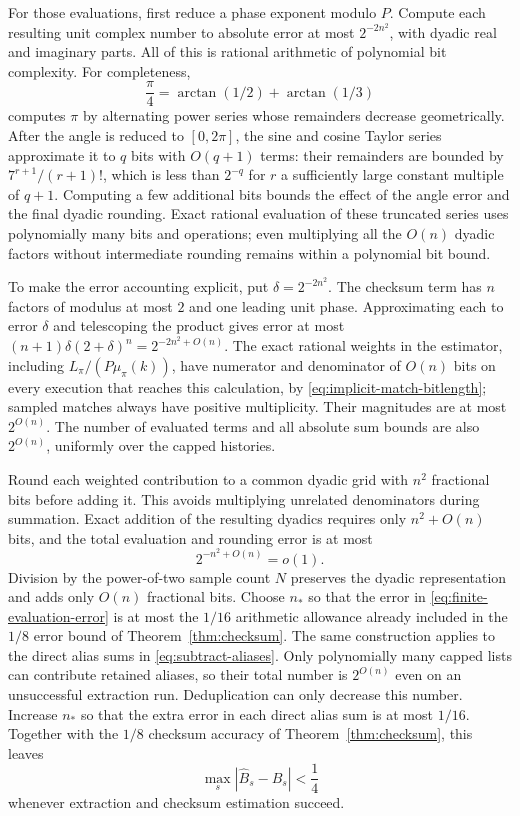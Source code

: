 For those evaluations, first reduce a phase exponent modulo $P$.  Compute
each resulting unit complex number to absolute error at most
$2^{-2n^2}$, with dyadic real and imaginary parts.  All of this is rational
arithmetic of polynomial bit complexity.  For completeness,
\[
 \frac\pi4=\arctan(1/2)+\arctan(1/3)
\]
computes $\pi$ by alternating power series whose remainders decrease
geometrically.  After the angle is reduced to $[0,2\pi]$, the sine and
cosine Taylor series approximate it to $q$ bits with $O(q+1)$ terms:
their remainders are bounded by $7^{r+1}/(r+1)!$, which is less than
$2^{-q}$ for $r$ a sufficiently large constant multiple of $q+1$.
Computing a few additional bits bounds the effect of the angle error and
the final dyadic rounding.  Exact rational evaluation of these truncated
series uses polynomially many bits and operations; even multiplying all
the $O(n)$ dyadic factors without intermediate rounding remains within
a polynomial bit bound.

To make the error accounting explicit, put $\delta=2^{-2n^2}$.
The checksum term has $n$ factors of modulus at most $2$ and one leading
unit phase.  Approximating each to error $\delta$ and telescoping the
product gives error at most
$(n+1)\delta(2+\delta)^n=2^{-2n^2+O(n)}$.  The exact rational weights in
the estimator, including $L_\pi/(P\mu_\pi(k))$, have numerator
and denominator of $O(n)$ bits on every execution that reaches this
calculation, by \eqref{eq:implicit-match-bitlength}; sampled matches
always have positive multiplicity.  Their magnitudes are at most
$2^{O(n)}$.  The number of evaluated terms and all absolute sum bounds
are also $2^{O(n)}$, uniformly over the capped histories.

Round each weighted contribution to a common dyadic grid with $n^2$
fractional bits before adding it.  This avoids multiplying unrelated
denominators during summation.  Exact addition of the resulting dyadics
requires only $n^2+O(n)$ bits, and the total evaluation and rounding error
is at most
\begin{equation}
 2^{-n^2+O(n)}=o(1).
 \label{eq:finite-evaluation-error}
\end{equation}
Division by the power-of-two sample count $N$ preserves the dyadic
representation and adds only $O(n)$ fractional bits.
Choose $n_*$ so that the error in \eqref{eq:finite-evaluation-error} is
at most the $1/16$ arithmetic allowance
already included in the $1/8$ error bound of
Theorem~\ref{thm:checksum}.
The same construction applies to the direct alias sums in
\eqref{eq:subtract-aliases}.  Only polynomially many capped lists can
contribute retained aliases, so their total number is $2^{O(n)}$ even on
an unsuccessful extraction run.  Deduplication can only decrease this
number.  Increase $n_*$ so that the extra error in each direct alias sum
is at most $1/16$.  Together with the $1/8$ checksum accuracy of
Theorem~\ref{thm:checksum}, this leaves
\begin{equation}
 \max_s|\widehat B_s-B_s|<\frac14
 \label{eq:residual-accuracy}
\end{equation}
whenever extraction and checksum estimation succeed.

